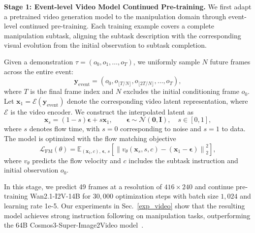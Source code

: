 \textbf{Stage 1: Event-level Video Model Continued Pre-training.}
We first adapt a pretrained video generation model to the manipulation
domain through event-level continued pre-training.
Each training example covers a complete manipulation subtask, aligning
the subtask description with the corresponding visual evolution from
the initial observation to subtask completion.

Given a demonstration $\tau = (o_0, o_1, \ldots, o_T)$,
we uniformly sample $N$ future frames across the entire event:
\begin{equation}
    \mathbf{y}_{\mathrm{event}}
    =
    \left( o_0,
        o_{\lfloor T/N \rfloor},
        o_{\lfloor 2T/N \rfloor},
        \ldots,
        o_T
    \right),
\end{equation}
where $T$ is the final frame index and $N$ excludes the initial
conditioning frame $o_0$.
Let $\mathbf{x}_1 = \mathcal{E}(\mathbf{y}_{\mathrm{event}})$
denote the corresponding video latent representation, where
$\mathcal{E}$ is the video encoder.
We construct the interpolated latent as
\begin{equation}
    \mathbf{x}_s
    =
    (1-s)\boldsymbol{\epsilon} + s\mathbf{x}_1,
    \qquad
    \boldsymbol{\epsilon} \sim \mathcal{N}(\mathbf{0}, \mathbf{I}),
    \quad s \in [0,1],
\end{equation}
where $s$ denotes flow time, with $s=0$ corresponding to noise and
$s=1$ to data.
The model is optimized with the flow matching objective~\citep{lipman2023flow}
\begin{equation}
    \mathcal{L}_{\mathrm{FM}}(\theta)
    =
    \mathbb{E}_{(\mathbf{x}_1,c),\,\boldsymbol{\epsilon},\,s}
    \left[
        \left\|
            v_\theta(\mathbf{x}_s,s,c)
            -
            (\mathbf{x}_1-\boldsymbol{\epsilon})
        \right\|_2^2
    \right],
    \label{eq:video_fm}
\end{equation}
where $v_\theta$ predicts the flow velocity and $c$ includes the
subtask instruction and initial observation $o_0$.

In this stage, we predict 49 frames at a resolution of \(416 \times 240\) and continue pre-training Wan2.1-I2V-14B for $30{,}000$ optimization
steps with batch size $1{,}024$ and learning rate 1e-5.
Our experiments in Sec.~\ref{exp_video}  show that the resulting model achieves strong
instruction following on manipulation tasks, outperforming the 64B Cosmos3-Super-Image2Video model~\citep{agarwal2026cosmos}.

